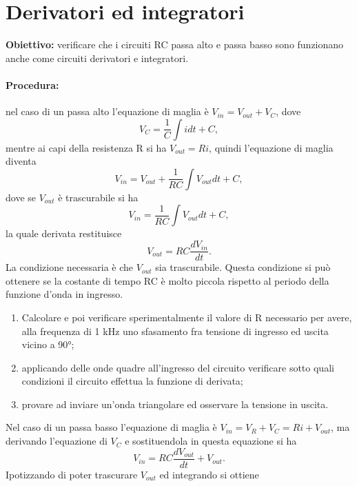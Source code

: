 \section{Derivatori ed integratori}

\textbf{Obiettivo:} verificare che i circuiti RC passa alto e passa basso sono funzionano anche come circuiti derivatori e integratori.

\paragraph{Procedura:}
nel caso di un passa alto l'equazione di maglia è $V_{in}=V_{out}+V_C$, dove 
\begin{equation}
    V_C=\frac{1}{C}\int idt+C,
\end{equation}
mentre ai capi della resistenza R si ha $V_{out}=Ri$, quindi l'equazione di maglia diventa
\begin{equation}
    V_{in}=V_{out}+\frac{1}{RC}\int V_{out}dt+C,
\end{equation}
dove se $V_{out}$ è trascurabile si ha
\begin{equation}
    V_{in}=\frac{1}{RC}\int V_{out}dt+C,
\end{equation}
la quale derivata restituisce
\begin{equation}
    V_{out}=RC\frac{dV_{in}}{dt}.
\end{equation}
La condizione necessaria è che $V_{out}$ sia trascurabile. Questa condizione si può ottenere se la costante di tempo RC è molto piccola rispetto al periodo della funzione d'onda in ingresso.
\begin{enumerate}
    \item Calcolare e poi verificare sperimentalmente il valore di R necessario per avere, alla frequenza di 1 kHz uno sfasamento fra tensione di ingresso ed uscita vicino a 90°;
    \item applicando delle onde quadre all'ingresso del circuito verificare sotto quali condizioni il circuito effettua la funzione di derivata;
    \item provare ad inviare un'onda triangolare ed osservare la tensione in uscita. 
\end{enumerate}
Nel caso di un passa basso l'equazione di maglia è $V_{in}=V_R+V_C=Ri+V_{out}$, ma derivando l'equazione di $V_C$ e sostituendola in questa equazione si ha
\begin{equation}
    V_{in}=RC\frac{dV_{out}}{dt}+V_{out}.
\end{equation}
Ipotizzando di poter trascurare $V_{out}$ ed integrando si ottiene
